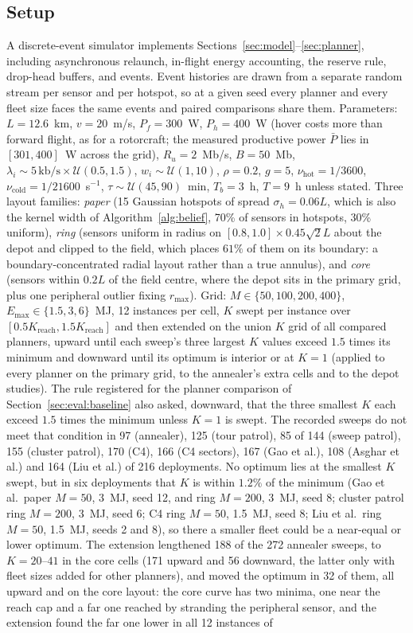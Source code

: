 \documentclass[journal,outdir=./]{IEEEtran}
\newcommand{\Kr}{K_{\mathrm{reach}}}
\newcommand{\rmax}{r_{\max}}
\newcommand{\Pbar}{\bar{P}}
\newcommand{\Pf}{P_{f}}
\newcommand{\Ph}{P_{h}}
\newcommand{\Emax}{E_{\max}}
\newcommand{\Ru}{R_u}
\begin{document}
\subsection{Setup}\label{sec:eval:setup}
A discrete-event simulator implements Sections~\ref{sec:model}--\ref{sec:planner}, including asynchronous relaunch, in-flight energy accounting, the reserve rule, drop-head buffers, and events. Event histories are drawn from a separate random stream per sensor and per hotspot, so at a given seed every planner and every fleet size faces the same events and paired comparisons share them. Parameters: $L=12.6$~km, $v=20$~m/s, $\Pf=300$~W, $\Ph=400$~W (hover costs more than forward flight, as for a rotorcraft; the measured productive power $\Pbar$ lies in $[301,400]$~W across the grid), $\Ru=2$~Mb/s, $B=50$~Mb, $\lambda_i\sim5\,\mathrm{kb/s}\times\mathcal{U}(0.5,1.5)$, $w_i\sim\mathcal{U}(1,10)$, $\rho=0.2$, $g=5$, $\nu_{\mathrm{hot}}=1/3600$, $\nu_{\mathrm{cold}}=1/21600$~s$^{-1}$, $\tau\sim\mathcal{U}(45,90)$~min, $T_b=3$~h, $T=9$~h unless stated. Three layout families: \emph{paper} (15 Gaussian hotspots of spread $\sigma_h=0.06L$, which is also the kernel width of Algorithm~\ref{alg:belief}, 70\% of sensors in hotspots, 30\% uniform), \emph{ring} (sensors uniform in radius on $[0.8,1.0]\times0.45\sqrt2L$ about the depot and clipped to the field, which places $61\%$ of them on its boundary: a boundary-concentrated radial layout rather than a true annulus), and \emph{core} (sensors within $0.2L$ of the field centre, where the depot sits in the primary grid, plus one peripheral outlier fixing $\rmax$). Grid: $M\in\{50,100,200,400\}$, $\Emax\in\{1.5,3,6\}$~MJ, 12 instances per cell, $K$ swept per instance over $[0.5\Kr,1.5\Kr]$ and then extended on the union $K$ grid of all compared planners, upward until each sweep's three largest $K$ values exceed $1.5$ times its minimum and downward until its optimum is interior or at $K=1$ (applied to every planner on the primary grid, to the annealer's extra cells and to the depot studies). The rule registered for the planner comparison of Section~\ref{sec:eval:baseline} also asked, downward, that the three smallest $K$ each exceed $1.5$ times the minimum unless $K=1$ is swept. The recorded sweeps do not meet that condition in 97 (annealer), 125 (tour patrol), 85 of 144 (sweep patrol), 155 (cluster patrol), 170 (C4), 166 (C4 sectors), 167 (Gao et al.), 108 (Asghar et al.) and 164 (Liu et al.) of 216 deployments. No optimum lies at the smallest $K$ swept, but in six deployments that $K$ is within $1.2\%$ of the minimum (Gao et al.\ paper $M=50$, 3~MJ, seed 12, and ring $M=200$, 3~MJ, seed 8; cluster patrol ring $M=200$, 3~MJ, seed 6; C4 ring $M=50$, 1.5~MJ, seed 8; Liu et al.\ ring $M=50$, 1.5~MJ, seeds 2 and 8), so there a smaller fleet could be a near-equal or lower optimum. The extension lengthened 188 of the 272 annealer sweeps, to $K=20$--$41$ in the core cells (171 upward and 56 downward, the latter only with fleet sizes added for other planners), and moved the optimum in 32 of them, all upward and on the core layout: the core curve has two minima, one near the reach cap and a far one reached by stranding the peripheral sensor, and the extension found the far one lower in all 12 instances of 
\end{document}

